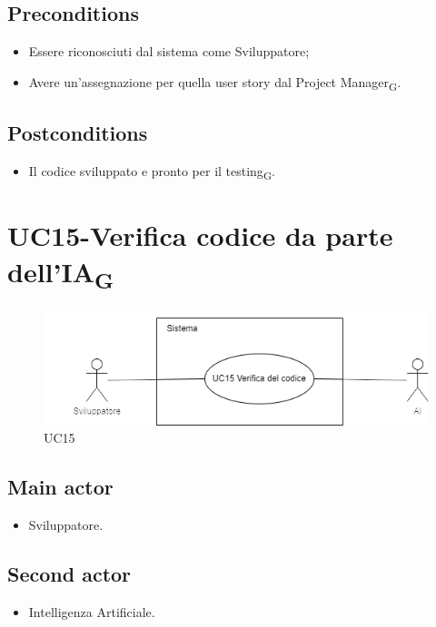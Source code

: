 \documentclass{article}
\begin{document}
    \subsection*{Preconditions}
        \begin{itemize}
            \item Essere riconosciuti dal sistema come Sviluppatore;
            \item Avere un'assegnazione per quella user story dal Project Manager\textsubscript{G}.
        \end{itemize}
        
    \subsection*{Postconditions} 
        \begin{itemize}
            \item Il codice sviluppato e pronto per il testing\textsubscript{G}.
        \end{itemize}
        
\section{UC15-Verifica codice da parte dell'IA\textsubscript{G}}
    \begin{figure}[h]
      \centering
      \includegraphics{./imgUML/UC15.png}
        \caption{UC15}
      \label{fig:UC15}
    \end{figure}
    
    \subsection*{Main actor}
        \begin{itemize}
            \item Sviluppatore.
        \end{itemize}
    \subsection*{Second actor}
        \begin{itemize}
            \item Intelligenza Artificiale.
        \end{itemize}
    
\end{document}
